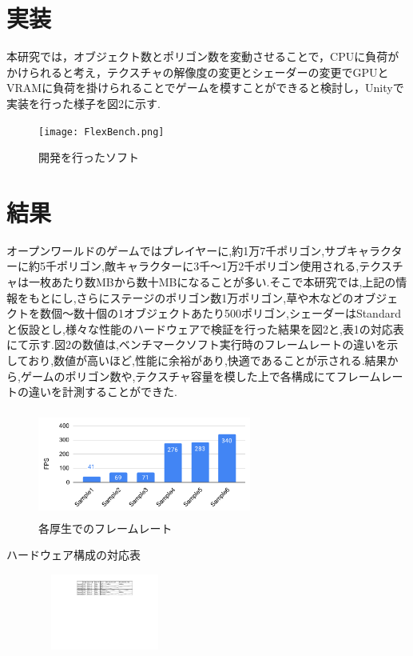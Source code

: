\documentclass[twocolumn,10pt,a4j]{ltjsarticle}
\begin{document}
\section{実装}
本研究では，オブジェクト数とポリゴン数を変動させることで，CPUに負荷がかけられると考え，テクスチャの解像度の変更とシェーダーの変更でGPUとVRAMに負荷を掛けられることでゲームを模すことができると検討し，Unityで実装を行った様子を図2に示す.

\vspace{2mm}
\begin{figure}[H]
\begin{center}
 \texttt{[image: FlexBench.png]}
\end{center}
 \caption{開発を行ったソフト}
 \label{fig:図1}
\end{figure}

\section{結果}
オープンワールドのゲームではプレイヤーに,約1万7千ポリゴン,サブキャラクターに約5千ポリゴン,敵キャラクターに3千～1万2千ポリゴン使用される,テクスチャは一枚あたり数MBから数十MBになることが多い.そこで本研究では,上記の情報をもとにし,さらにステージのポリゴン数1万ポリゴン,草や木などのオブジェクトを数個～数十個の1オブジェクトあたり500ポリゴン,シェーダーはStandardと仮設とし,様々な性能のハードウェアで検証を行った結果を図2と,表1の対応表にて示す.図2の数値は,ベンチマークソフト実行時のフレームレートの違いを示しており,数値が高いほど,性能に余裕があり,快適であることが示される.結果から,ゲームのポリゴン数や,テクスチャ容量を模した上で各構成にてフレームレートの違いを計測することができた.

\vspace{5mm}
\begin{figure}[H]
\begin{center}
 \includegraphics[clip,width=70mm,height=35mm]{グラフ.pdf}
\end{center}
 \caption{各厚生でのフレームレート}
 \label{fig:図1}
\end{figure}

\vspace{5mm}
\begin{table}[H]
\begin{center}
\caption{ハードウェア構成の対応表}
\vspace{2mm}
 \label{fig:教科書}
 \includegraphics[clip,width=65mm,height=25mm]{対応表.pdf}
\end{center}
\end{table}
\end{document}
